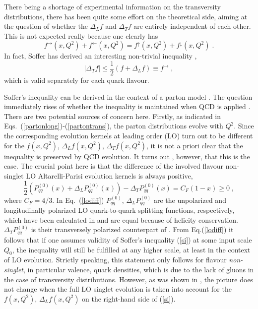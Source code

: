 There being a shortage of experimental information on the transversity 
distributions, there has been quite some effort on the theoretical side, 
aiming at the question of whether the $\Delta_L f$ and $\Delta_T f$ are 
entirely independent of each other. This is not expected really because
one clearly has  
\begin{equation} \label{equal}
f^{\rightarrow} (x,Q^2) + f^{\leftarrow} (x,Q^2)  = 
f^{\uparrow} (x,Q^2) + f^{\downarrow} (x,Q^2) \; .
\end{equation}
In fact, Soffer has derived an interesting non-trivial inequality 
\cite{soffer2,sivers}, 
\begin{equation} \label{si}
|\Delta_T f| \leq \frac{1}{2} \left( f + \Delta_L f \right) 
\equiv f^{\rightarrow} \; ,
\end{equation}
which is valid separately for each quark flavour. 

Soffer's inequality can be derived in the context of a parton model
\cite{soffer2,sivers,gold}. The question immediately rises of whether
the inequality is maintained when QCD is applied \cite{gold,cont2,bar}. 
There are two potential sources of concern here. Firstly, as indicated
in Eqs.~(\ref{partonlong})-(\ref{partontrans}), the parton distributions
evolve with $Q^2$. Since the corresponding evolution kernels at leading 
order (LO) \cite{ap,am} turn out to be different for the $f(x,Q^2)$, 
$\Delta_L f(x,Q^2)$, $\Delta_T f(x,Q^2)$, it is not a priori clear that
the inequality is preserved by QCD evolution. It turns out \cite{bar},
however, that this is the case. The crucial point here is that the 
difference of the involved flavour non-singlet LO Altarelli-Parisi evolution 
kernels is always positive, 
\begin{equation} \label{lodiff}
\frac{1}{2} \left( P_{qq}^{(0)} (x) + \Delta_L P_{qq}^{(0)} (x) \right) -
\Delta_T P_{qq}^{(0)} (x) = C_F (1-x) \geq 0 \; ,
\end{equation}
where $C_F=4/3$. In Eq.~(\ref{lodiff}) $P_{qq}^{(0)}$, 
$\Delta_L P_{qq}^{(0)}$ are the unpolarized and longitudinally polarized 
LO quark-to-quark splitting functions, respectively, which have been 
calculated in \cite{ap} and are equal because of helicity conservation. 
$\Delta_T P_{qq}^{(0)}$ is their transversely polarized counterpart of 
\cite{am}. From Eq.(\ref{lodiff}) it follows that if one assumes validity of 
Soffer's inequality (\ref{si}) at some input scale $Q_0$, the inequality 
will still be fulfilled at any higher scale, at least in the context of 
LO evolution. Strictly speaking, this statement only follows 
for flavour {\em non-singlet}, in particular valence, quark densities, 
which is due to the lack of gluons in the case of 
transversity distributions. However, as was shown in \cite{bar}, 
the picture does not change when the full LO singlet evolution is
taken into account for the $f(x,Q^2)$, $\Delta_L f(x,Q^2)$ on the 
right-hand side of (\ref{si}). 


